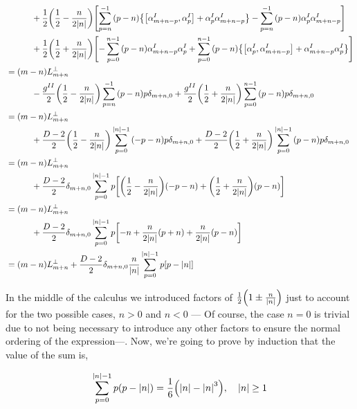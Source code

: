 \begin{align*}
    &\quad\quad\quad+\frac12\qty(\frac12-\frac{n}{2\abs{n}})\qty[\sum\limits_{p= n}^{-1}\qty(p-n)\qty{\comm{\alpha_{m+n-p}^I}{\alpha_{p}^I}+\alpha_{p}^I\alpha_{m+n-p}^I}-\sum\limits_{p= n}^{-1}\qty(p-n)\alpha_{p}^I\alpha_{m+n-p}^I]\\
    &\quad\quad\quad+\frac12\qty(\frac12+\frac{n}{2\abs{n}})\qty[-\sum\limits_{p= 0}^{n-1}\qty(p-n)\alpha_{m+n-p}^I\alpha_{p}^I+\sum\limits_{p= 0}^{n-1}\qty(p-n)\qty{\comm{\alpha_{p}^I}{\alpha_{m+n-p}^I}+\alpha_{m+n-p}^I\alpha_{p}^I}]\\
    &=\qty(m-n)L_{m+n}^\perp\\
    &\quad\quad\quad-\frac{g^{II}}{2}\qty(\frac12-\frac{n}{2\abs{n}})\sum\limits_{p= n}^{-1}\qty(p-n)p\delta_{m+n,0}+\frac{g^{II}}{2}\qty(\frac12+\frac{n}{2\abs{n}})\sum\limits_{p= 0}^{n-1}\qty(p-n)p\delta_{m+n,0}\\
    &=\qty(m-n)L_{m+n}^\perp\\
    &\quad\quad\quad+\frac{D-2}{2}\qty(\frac12-\frac{n}{2\abs{n}})\sum\limits_{p= 0}^{\abs{n}-1}\qty(-p-n)p\delta_{m+n,0}+\frac{D-2}{2}\qty(\frac12+\frac{n}{2\abs{n}})\sum\limits_{p= 0}^{\abs{n}-1}\qty(p-n)p\delta_{m+n,0}\\
    &=\qty(m-n)L_{m+n}^\perp\\
    &\quad\quad\quad+\frac{D-2}{2}\delta_{m+n,0}\sum\limits_{p= 0}^{\abs{n}-1}p\qty[\qty(\frac12-\frac{n}{2\abs{n}})\qty(-p-n)+\qty(\frac12+\frac{n}{2\abs{n}})\qty(p-n)]\\
    &=\qty(m-n)L_{m+n}^\perp\\
    &\quad\quad\quad+\frac{D-2}{2}\delta_{m+n,0}\sum\limits_{p= 0}^{\abs{n}-1}p\qty[-n+\frac{n}{2\abs{n}}\qty(p+n)+\frac{n}{2\abs{n}}\qty(p-n)]\\
    &=\qty(m-n)L_{m+n}^\perp+\frac{D-2}{2}\delta_{m+n,0}\frac{n}{\abs{n}}\sum\limits_{p= 0}^{\abs{n}-1}p\qty[p-\abs{n}]
\end{align*}

In the middle of the calculus we introduced factors of $\frac12\qty(1\pm \frac{n}{\abs{n}})$ just to account for the two possible cases, $n>0$ and $n<0$ --- Of course, the case $n=0$ is trivial 
due to not being necessary to introduce any other factors to ensure the normal ordering of the expression---. 
Now, we're going to prove by induction that the value of the sum is,

\begin{align*}
    \sum\limits_{p=0}^{\abs{n}-1}p\qty(p-\abs{n})=\frac16\qty(\abs{n}-\abs{n}^3),\ \ \ \abs{n}\geq 1
\end{align*}

